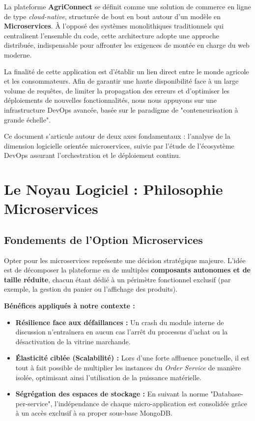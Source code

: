 \documentclass[12pt,a4paper]{article}
\begin{document}
La plateforme \textbf{AgriConnect} se définit comme une solution de commerce en ligne de type \textit{cloud-native}, structurée de bout en bout autour d'un modèle en \textbf{Microservices}. À l'opposé des systèmes monolithiques traditionnels qui centralisent l'ensemble du code, cette architecture adopte une approche distribuée, indispensable pour affronter les exigences de montée en charge du web moderne.

La finalité de cette application est d'établir un lien direct entre le monde agricole et les consommateurs. Afin de garantir une haute disponibilité face à un large volume de requêtes, de limiter la propagation des erreurs et d'optimiser les déploiements de nouvelles fonctionnalités, nous nous appuyons sur une infrastructure DevOps avancée, basée sur le paradigme de "conteneurisation à grande échelle".

Ce document s'articule autour de deux axes fondamentaux : l'analyse de la dimension logicielle orientée microservices, suivie par l'étude de l'écosystème DevOps assurant l'orchestration et le déploiement continu.

\section{Le Noyau Logiciel : Philosophie Microservices}

\subsection{Fondements de l'Option Microservices}
Opter pour les microservices représente une décision stratégique majeure. L'idée est de décomposer la plateforme en de multiples \textbf{composants autonomes et de taille réduite}, chacun étant dédié à un périmètre fonctionnel exclusif (par exemple, la gestion du panier ou l'affichage des produits).

\textbf{Bénéfices appliqués à notre contexte :}
\begin{itemize}
    \item \textbf{Résilience face aux défaillances :} Un crash du module interne de discussion n'entraînera en aucun cas l'arrêt du processus d'achat ou la désactivation de la vitrine marchande.
    \item \textbf{Élasticité ciblée (Scalabilité) :} Lors d'une forte affluence ponctuelle, il est tout à fait possible de multiplier les instances du \textit{Order Service} de manière isolée, optimisant ainsi l'utilisation de la puissance matérielle.
    \item \textbf{Ségrégation des espaces de stockage :} En suivant la norme "Database-per-service", l'indépendance de chaque micro-application est consolidée grâce à un accès exclusif à sa proper sous-base MongoDB.
\end{itemize}
\end{document}
